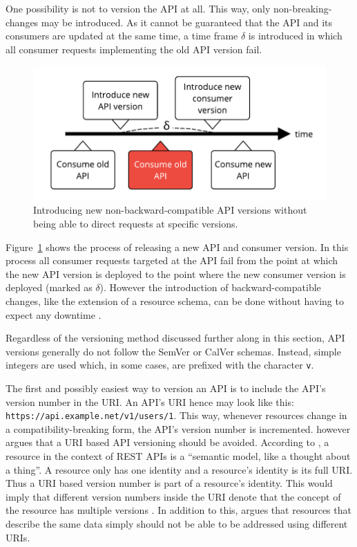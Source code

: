One possibility is not to version the \ac{API} at all. This way, only
non-breaking-changes may be introduced. As it cannot be guaranteed that the
\ac{API} and its consumers are updated at the same time, a time frame $\delta$
is introduced in which all consumer requests implementing the old \ac{API}
version fail.

\begin{figure}[H]
\begin{center}
  \includegraphics[scale=0.7]{images/figures/api_releases.pdf}
\end{center}
\caption{Introducing new non-backward-compatible \ac{API} versions without being able to direct requests at specific versions.}%
\label{fig:api_releases}
\end{figure}

Figure~\ref{fig:api_releases} shows the process of releasing a new \ac{API} and
consumer version. In this process all consumer requests targeted at the
\ac{API} fail from the point at which the new \ac{API} version is deployed to
the point where the new consumer version is deployed (marked as $\delta$).
However the introduction of backward-compatible changes, like the extension of
a resource schema, can be done without having to expect any downtime
\autocite{MicrosoftAPIdesign2018}.

Regardless of the versioning method discussed further along in this section,
\ac{API} versions generally do not follow the SemVer or CalVer schemas.
Instead, simple integers are used which, in some cases, are prefixed with the
character \texttt{v}.

The first and possibly easiest way to version an \ac{API} is to include the
\ac{API}'s version number in the \ac{URI}. An \ac{API}'s \ac{URI} hence may
look like this: \texttt{https://api.example.net/v1/users/1}. This way, whenever
resources change in a compatibility-breaking form, the \ac{API}'s version
number is incremented. \autocite[Ch. 6]{MasseRESTAPIDesign2011} however argues
that a \ac{URI} based \ac{API} versioning should be avoided. According to
\autocite{MasseRESTAPIDesign2011}, a resource in the context of \ac{REST}
\acp{API} is a \enquote{semantic model, like a thought about a thing}.
A resource only has one identity and a resource's identity
is its full \ac{URI}. Thus a \ac{URI} based version number is part of a
resource's identity. This would imply that different version numbers inside the
\ac{URI} denote that the concept of the resource has multiple versions
\autocite[Ch. 6]{MasseRESTAPIDesign2011}. In addition to this,
\autocite{MicrosoftAPIdesign2018} argues that resources that describe the same
data simply should not be able to be addressed using different \acp{URI}.

